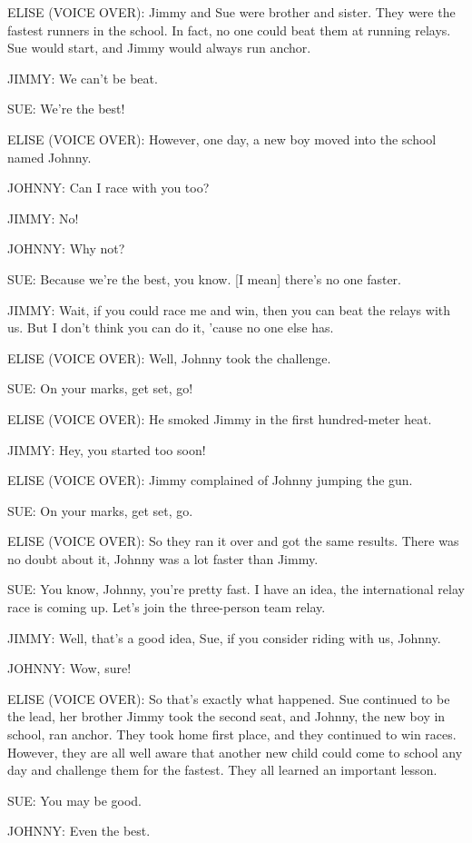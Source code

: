 ELISE (VOICE OVER):
Jimmy and Sue were brother and sister.
They were the fastest runners in the school.
In fact, no one could beat them at running relays.
Sue would start, and Jimmy would always run anchor.

JIMMY:
We can't be beat.

SUE:
We're the best!

ELISE (VOICE OVER):
However, one day, a new boy moved into the school named Johnny.

JOHNNY:
Can I race with you too?

JIMMY:
No!

JOHNNY:
Why not?

SUE:
Because we're the best, you know.
    [I mean] there's no one faster.

JIMMY:
Wait, if you could race me and win, then you can beat the relays with us.
But I don't think you can do it, 'cause no one else has.

ELISE (VOICE OVER):
Well, Johnny took the challenge.

SUE:
On your marks, get set, go!

ELISE (VOICE OVER):
He smoked Jimmy in the first hundred-meter heat.

JIMMY:
Hey, you started too soon!

ELISE (VOICE OVER):
Jimmy complained of Johnny jumping the gun.

SUE:
On your marks, get set, go.

ELISE (VOICE OVER):
So they ran it over and got the same results.
There was no doubt about it, Johnny was a lot faster than Jimmy.

SUE:
You know, Johnny, you're pretty fast.
I have an idea, the international relay race is coming up.
Let's join the three-person team relay.

JIMMY:
Well, that's a good idea, Sue, if you consider riding with us, Johnny.

JOHNNY:
Wow, sure!

ELISE (VOICE OVER):
So that's exactly what happened.
Sue continued to be the lead, her brother Jimmy took the second seat, and Johnny, the new boy in school, ran anchor.
They took home first place, and they continued to win races.
However, they are all well aware that another new child could come to school any day and challenge them for the fastest.
They all learned an important lesson.

SUE:
You may be good.

JOHNNY:
Even the best.

